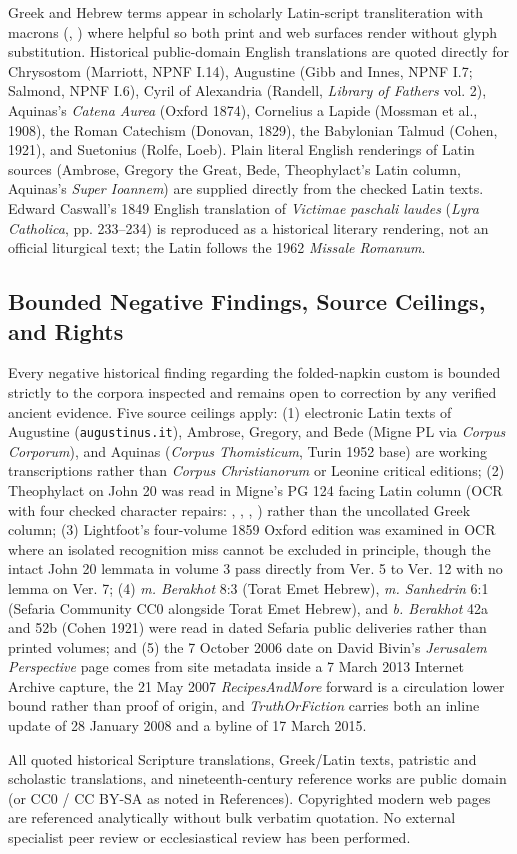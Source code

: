Greek and Hebrew terms appear in scholarly Latin-script transliteration with macrons (, ) where helpful so both print and web surfaces render without glyph substitution. Historical public-domain English translations are quoted directly for Chrysostom (Marriott, NPNF I.14), Augustine (Gibb and Innes, NPNF I.7; Salmond, NPNF I.6), Cyril of Alexandria (Randell, \emph{Library of Fathers} vol. 2), Aquinas's \emph{Catena Aurea} (Oxford 1874), Cornelius a Lapide (Mossman et al., 1908), the Roman Catechism (Donovan, 1829), the Babylonian Talmud (Cohen, 1921), and Suetonius (Rolfe, Loeb). Plain literal English renderings of Latin sources (Ambrose, Gregory the Great, Bede, Theophylact's Latin column, Aquinas's \emph{Super Ioannem}) are supplied directly from the checked Latin texts. Edward Caswall's 1849 English translation of \emph{Victimae paschali laudes} (\emph{Lyra Catholica}, pp. 233--234) is reproduced as a historical literary rendering, not an official liturgical text; the Latin follows the 1962 \emph{Missale Romanum}.

\subsection{Bounded Negative Findings, Source Ceilings, and Rights}

Every negative historical finding regarding the folded-napkin custom is bounded strictly to the corpora inspected and remains open to correction by any verified ancient evidence. Five source ceilings apply: (1) electronic Latin texts of Augustine (\texttt{augustinus.it}), Ambrose, Gregory, and Bede (Migne PL via \emph{Corpus Corporum}), and Aquinas (\emph{Corpus Thomisticum}, Turin 1952 base) are working transcriptions rather than \emph{Corpus Christianorum} or Leonine critical editions; (2) Theophylact on John 20 was read in Migne's PG 124 facing Latin column (OCR with four checked character repairs: , , , ) rather than the uncollated Greek column; (3) Lightfoot's four-volume 1859 Oxford edition was examined in OCR where an isolated recognition miss cannot be excluded in principle, though the intact John 20 lemmata in volume 3 pass directly from Ver. 5 to Ver. 12 with no lemma on Ver. 7; (4) \emph{m. Berakhot} 8:3 (Torat Emet Hebrew), \emph{m. Sanhedrin} 6:1 (Sefaria Community CC0 alongside Torat Emet Hebrew), and \emph{b. Berakhot} 42a and 52b (Cohen 1921) were read in dated Sefaria public deliveries rather than printed volumes; and (5) the 7 October 2006 date on David Bivin's \emph{Jerusalem Perspective} page comes from site metadata inside a 7 March 2013 Internet Archive capture, the 21 May 2007 \emph{RecipesAndMore} forward is a circulation lower bound rather than proof of origin, and \emph{TruthOrFiction} carries both an inline update of 28 January 2008 and a byline of 17 March 2015.

All quoted historical Scripture translations, Greek/Latin texts, patristic and scholastic translations, and nineteenth-century reference works are public domain (or CC0 / CC BY-SA as noted in References). Copyrighted modern web pages are referenced analytically without bulk verbatim quotation. No external specialist peer review or ecclesiastical review has been performed.
